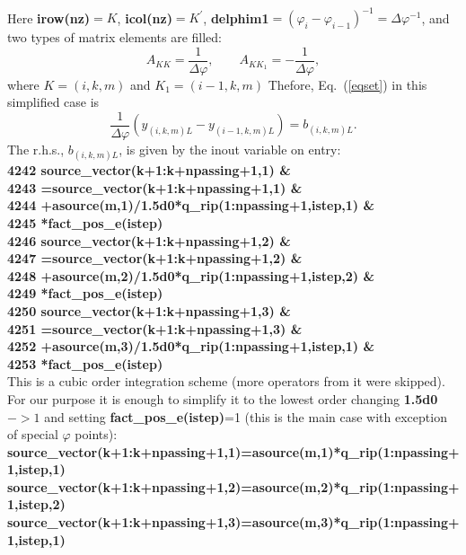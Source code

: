 \documentclass[preprint,prb,aps]{revtex4-1}
\newcommand{\be}[1]{\begin{equation} \label{#1}}
\newcommand{\ee}{\end{equation}}
\newcommand{\eq}[1]{(\ref{#1})}
\begin{document}
\\
Here {\bf irow(nz)}$=K$, {\bf icol(nz)}$=K^\prime$, {\bf delphim1}$=(\varphi_i-\varphi_{i-1})^{-1}=\Delta\varphi^{-1}$,
and two types of matrix elements are filled:
$$
A_{KK}=\frac{1}{\Delta\varphi}, \qquad A_{KK_1}=-\frac{1}{\Delta\varphi},
$$
where $K=(i,k,m)$ and $K_1=(i-1,k,m)$
Thefore, Eq.~\eq{eqset} in this simplified case is
\be{sympleqset}
\frac{1}{\Delta\varphi}\left(y_{(i,k,m)L}-y_{(i-1,k,m)L}\right)=b_{(i,k,m)L}.
\ee
The r.h.s., $b_{(i,k,m)L}$, is given by the inout variable on entry:
\\
{\bf
4242             source\_vector(k+1:k+npassing+1,1)                                \& \\
4243                  =source\_vector(k+1:k+npassing+1,1)                          \& \\
4244                  +asource(m,1)/1.5d0*q\_rip(1:npassing+1,istep,1)             \& \\
4245                  *fact\_pos\_e(istep)\\
4246             source\_vector(k+1:k+npassing+1,2)                                \& \\
4247                  =source\_vector(k+1:k+npassing+1,2)                          \& \\
4248                  +asource(m,2)/1.5d0*q\_rip(1:npassing+1,istep,2)             \& \\
4249                  *fact\_pos\_e(istep)\\
4250             source\_vector(k+1:k+npassing+1,3)                                \& \\
4251                  =source\_vector(k+1:k+npassing+1,3)                          \& \\
4252                  +asource(m,3)/1.5d0*q\_rip(1:npassing+1,istep,1)             \& \\
4253                  *fact\_pos\_e(istep)
}
\\
This is a cubic order integration scheme (more operators from it were skipped). For our purpose it is enough
to simplify it to the lowest order changing {\bf 1.5d0} $-> 1$ and setting {\bf fact\_pos\_e(istep)}=1 (this is the
main case with exception of special $\varphi$ points):
\\
{\bf
source\_vector(k+1:k+npassing+1,1)=asource(m,1)*q\_rip(1:npassing+1,istep,1) \\
source\_vector(k+1:k+npassing+1,2)=asource(m,2)*q\_rip(1:npassing+1,istep,2) \\
source\_vector(k+1:k+npassing+1,3)=asource(m,3)*q\_rip(1:npassing+1,istep,1)
}
\end{document}
